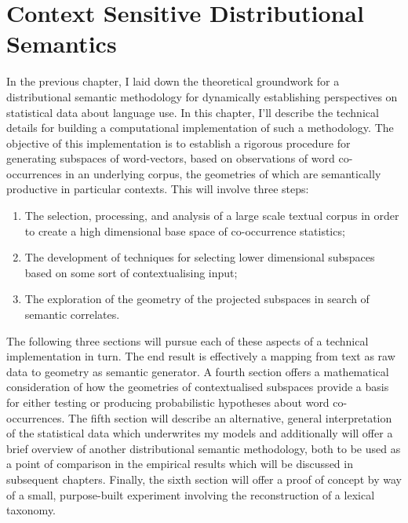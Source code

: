 \chapter{Context Sensitive Distributional Semantics} \label{chap:method}
In the previous chapter, I laid down the theoretical groundwork for a distributional semantic methodology for dynamically establishing perspectives on statistical data about language use.  In this chapter, I'll describe the technical details for building a computational implementation of such a methodology.  The objective of this implementation is to establish a rigorous procedure for generating subspaces of word-vectors, based on observations of word co-occurrences in an underlying corpus, the geometries of which are semantically productive in particular contexts.  This will involve three steps:

\begin{enumerate}
\item The selection, processing, and analysis of a large scale textual corpus in order to create a high dimensional base space of co-occurrence statistics;
\item The development of techniques for selecting lower dimensional subspaces based on some sort of contextualising input;
\item The exploration of the geometry of the projected subspaces in search of semantic correlates.
\end{enumerate}

The following three sections will pursue each of these aspects of a technical implementation in turn.  The end result is effectively a mapping from text as raw data to geometry as semantic generator.  A fourth section offers a mathematical consideration of how the geometries of contextualised subspaces provide a basis for either testing or producing probabilistic hypotheses about word co-occurrences.  The fifth section will describe an alternative, general interpretation of the statistical data which underwrites my models and additionally will offer a brief overview of another distributional semantic methodology, both to be used as a point of comparison in the empirical results which will be discussed in subsequent chapters.  Finally, the sixth section will offer a proof of concept by way of a small, purpose-built experiment involving the reconstruction of a lexical taxonomy.


